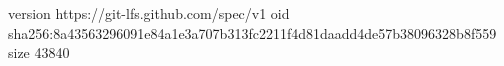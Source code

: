 version https://git-lfs.github.com/spec/v1
oid sha256:8a43563296091e84a1e3a707b313fc2211f4d81daadd4de57b38096328b8f559
size 43840
